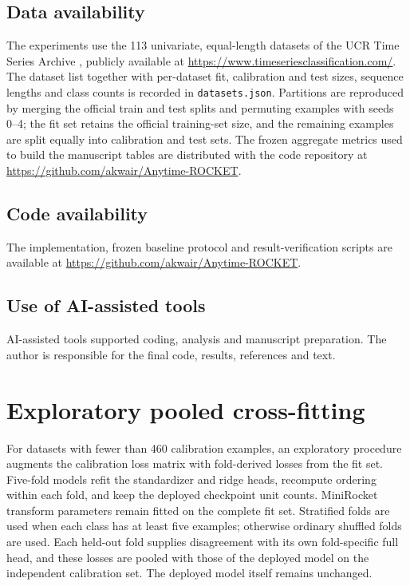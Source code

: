 \documentclass[pdflatex,sn-basic,Numbered]{sn-jnl}
\begin{document}
\subsection*{Data availability}
The experiments use the 113 univariate, equal-length datasets of the UCR Time Series Archive \cite{ucr}, publicly available at \url{https://www.timeseriesclassification.com/}. The dataset list together with per-dataset fit, calibration and test sizes, sequence lengths and class counts is recorded in \texttt{datasets.json}. Partitions are reproduced by merging the official train and test splits and permuting examples with seeds 0--4; the fit set retains the official training-set size, and the remaining examples are split equally into calibration and test sets. The frozen aggregate metrics used to build the manuscript tables are distributed with the code repository at \url{https://github.com/akwair/Anytime-ROCKET}.
\subsection*{Code availability}
The implementation, frozen baseline protocol and result-verification scripts are available at \url{https://github.com/akwair/Anytime-ROCKET}.
\subsection*{Use of AI-assisted tools}
AI-assisted tools supported coding, analysis and manuscript preparation. The author is responsible for the final code, results, references and text.

\appendix
\section{Exploratory pooled cross-fitting}\label{app:crossfit}
For datasets with fewer than 460 calibration examples, an exploratory procedure augments the calibration loss matrix with fold-derived losses from the fit set. Five-fold models refit the standardizer and ridge heads, recompute ordering within each fold, and keep the deployed checkpoint unit counts. MiniRocket transform parameters remain fitted on the complete fit set. Stratified folds are used when each class has at least five examples; otherwise ordinary shuffled folds are used. Each held-out fold supplies disagreement with its own fold-specific full head, and these losses are pooled with those of the deployed model on the independent calibration set. The deployed model itself remains unchanged.
\end{document}
